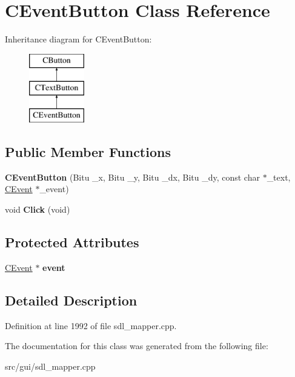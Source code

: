 \hypertarget{classCEventButton}{\section{C\-Event\-Button Class Reference}
\label{classCEventButton}
}
Inheritance diagram for C\-Event\-Button\-:\begin{figure}[H]
\begin{center}
\leavevmode
\includegraphics[height=3.000000cm]{classCEventButton}
\end{center}
\end{figure}
\subsection*{Public Member Functions}
\begin{DoxyCompactItemize}
\item 
\hypertarget{classCEventButton_a79fd3e96e7f7f1b3c4565f02535c3429}{{\bfseries C\-Event\-Button} (Bitu \-\_\-x, Bitu \-\_\-y, Bitu \-\_\-dx, Bitu \-\_\-dy, const char $\ast$\-\_\-text, \hyperlink{classCEvent}{C\-Event} $\ast$\-\_\-event)}\label{classCEventButton_a79fd3e96e7f7f1b3c4565f02535c3429}

\item 
\hypertarget{classCEventButton_ab88a51cd41e89b95cc7fbb7d78562fbe}{void {\bfseries Click} (void)}\label{classCEventButton_ab88a51cd41e89b95cc7fbb7d78562fbe}

\end{DoxyCompactItemize}
\subsection*{Protected Attributes}
\begin{DoxyCompactItemize}
\item 
\hypertarget{classCEventButton_a5f0d42f7b82112c4b144f84f308f1527}{\hyperlink{classCEvent}{C\-Event} $\ast$ {\bfseries event}}\label{classCEventButton_a5f0d42f7b82112c4b144f84f308f1527}

\end{DoxyCompactItemize}


\subsection{Detailed Description}


Definition at line 1992 of file sdl\-\_\-mapper.\-cpp.



The documentation for this class was generated from the following file\-:\begin{DoxyCompactItemize}
\item 
src/gui/sdl\-\_\-mapper.\-cpp\end{DoxyCompactItemize}
